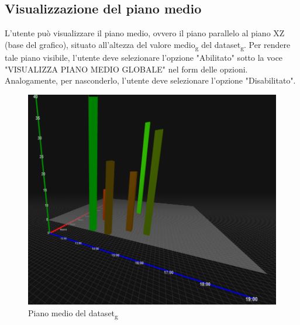 \subsection{Visualizzazione del piano medio}
L'utente può visualizzare il piano medio, ovvero il piano parallelo al
piano XZ (base del grafico), situato all'altezza del valore medio\textsubscript{g} del dataset\textsubscript{g}.
Per rendere tale piano visibile, l'utente deve selezionare l'opzione "Abilitato" sotto la voce
"VISUALIZZA PIANO MEDIO GLOBALE" nel form delle opzioni. Analogamente, per
nasconderlo, l'utente deve selezionare l'opzione "Disabilitato".
\begin{figure}[H]
    \centering
    \includegraphics[scale=0.6]{template/images/avgplane.png}
    \caption{Piano medio del dataset\textsubscript{g}}
\end{figure}

